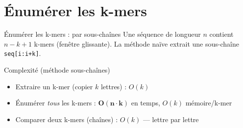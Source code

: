\documentclass[aspectratio=169,11pt]{beamer}
\begin{document}
\section{Énumérer les k-mers}

\begin{frame}{Énumérer les k-mers : par sous-chaînes}
  Une séquence de longueur $n$ contient $n-k+1$ k-mers (fenêtre glissante).
  La méthode naïve extrait une sous-chaîne \texttt{seq[i:i+k]}.
  \smallskip

  \centering

  \smallskip
  \begin{block}{Complexité (méthode sous-chaînes)}
    \footnotesize
    \begin{itemize}
      \item Extraire un k-mer (copier $k$ lettres) : $O(k)$
      \item Énumérer \emph{tous} les k-mers : $\mathbf{O(n\cdot k)}$ en temps, $O(k)$ mémoire/k-mer
      \item Comparer deux k-mers (chaînes) : $O(k)$ — lettre par lettre
    \end{itemize}
  \end{block}
\end{frame}
\end{document}
